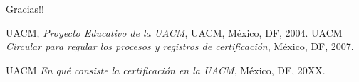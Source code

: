 \documentclass[xcolor=dvipsnames]{beamer}
\begin{document}
\begin{frame}

\begin{centering}
{\Huge{ Gracias!!\\

}}

\end{centering}
\end{frame}




\begin{frame}

\begin{thebibliography}{20}
 \textsc{UACM},
\textit{Proyecto Educativo de la UACM},
UACM, M\'exico, DF, 2004.
 \textsc{UACM} 
\textit{Circular para regular los procesos y registros de certificaci\'on}, M\'exico, DF, 2007.

 \textsc{UACM} 
\textit{En qu\'e consiste la certificaci\'on en la UACM}, M\'exico, DF, 20XX.


\end{thebibliography}
\end{frame}
\end{document}
